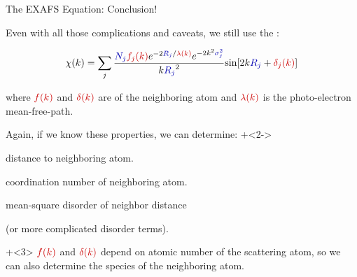 

\begin{slide}{The EXAFS Equation: Conclusion!}


  \begin{cenpage}{120mm}

    Even with all those complications and caveats, we still use the
    {}: \vspace{-1mm}

  \begin{center}
    \[ \chi(k) = \sum_j {\frac{{\Blue{N_j}} {\Red{f_j(k)}}
        e^{-2{\Blue{R_j}}/{\Red{\lambda(k)}}}
        e^{-2k^2{\Blue{\sigma_j^2}}}}{k{\Blue{R_j}}^2}
      {\sin[{2k{\Blue{R_j}} + {\Red{\delta_j(k)}}] }}} \]
  \end{center}

  \vmm

  where $\Red{f(k)}$ and $\Red{\delta(k)}$ are
  {} of the neighboring
  atom and $ \Red{\lambda(k)} $ is the photo-electron mean-free-path.

  \vmm


  \vmm
Again, if we know these properties, we can determine:
  \onslide+<2->
    \begin{description}
      \settowidth{\labelwidth}{15mm}
      \setlength{\itemindent}{15mm}
      \setlength{\leftmargin}{15mm}
    \item[$R$] distance to neighboring atom.
    \item[$N$] coordination number of neighboring atom.
    \item[$\sigma^2$] mean-square disorder of neighbor distance \par
      \hspace{13.5mm} (or
      more complicated disorder terms).
    \end{description}

  \vmm
  \onslide+<3>
  ${\Red{f(k)}}$ and ${\Red{\delta(k)}}$ depend on atomic number
  {} of the scattering atom, so we can also determine the
  species of the neighboring atom.

\end{cenpage}

\end{slide}
